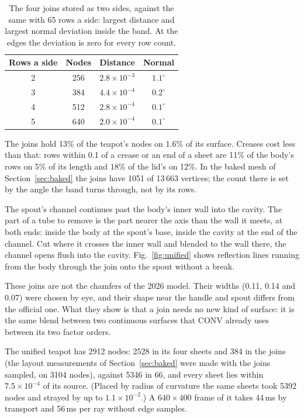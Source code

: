 \documentclass[journal]{IEEEtran}
\begin{document}
\begin{table}[H]
\caption{The four joins stored as two sides, against the same with 65
rows a side: largest distance and largest normal deviation inside the
band. At the edges the deviation is zero for every row count.}
\label{tab:joinstore}
\centering
\scriptsize
\begin{tabular}{c|c|cc}
\hline
Rows a side & Nodes & Distance & Normal\\
\hline
2 & 256 & $2.8\times10^{-3}$ & $1.1^\circ$\\
3 & 384 & $4.4\times10^{-4}$ & $0.2^\circ$\\
4 & 512 & $2.8\times10^{-4}$ & $0.1^\circ$\\
5 & 640 & $2.0\times10^{-4}$ & $0.1^\circ$\\
\hline
\end{tabular}
\end{table}

The joins hold 13\% of the teapot's nodes on 1.6\% of its surface. Creases cost less than that: rows
within 0.1 of a crease or an end of a sheet are 11\% of the body's rows
on 5\% of its length and 18\% of the lid's on 12\%. In the baked mesh
of Section~\ref{sec:baked} the joins have 1051 of 13\,663 vertices; the
count there is set by the angle the band turns through, not by its rows.

The spout's channel continues past the body's inner wall into the
cavity. The part of a tube to
remove is the part nearer the axis than the wall it meets, at both ends:
inside the body at the spout's base, inside the cavity at the end of the
channel. Cut where it crosses the inner wall and blended to the wall
there, the channel opens flush into the cavity.
Fig.~\ref{fig:unified} shows reflection lines running from the body
through the join onto the spout without a break.

These joins are not the chamfers of the 2026 model. Their widths (0.11,
0.14 and 0.07) were chosen by eye, and their shape near the handle and
spout differs from the official one. What they show is that a join needs
no new kind of surface: it is the same blend between two continuous
surfaces that CONV already uses between its two factor orders.

The unified teapot has 2912 nodes: 2528 in its four sheets and 384 in
the joins (the layout measurements of Section~\ref{sec:baked} were made
with the joins sampled, on 3104 nodes), against 5346 in 66,
and every sheet lies within $7.5\times10^{-4}$ of its source. (Placed by
radius of curvature the same sheets took 5392 nodes and strayed by up to
$1.1\times10^{-2}$.) A $640\times400$ frame of it takes 44\,ms by
transport and 56\,ms per ray without edge samples.
\end{document}
